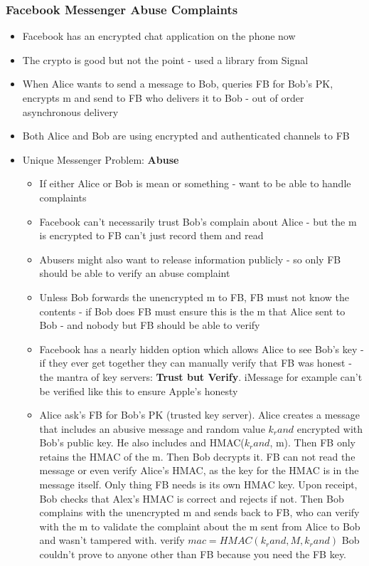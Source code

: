 \documentclass{article}
\begin{document}
\subsubsection{Facebook Messenger Abuse Complaints}
\begin{itemize}
\item Facebook has an encrypted chat application on the phone now
\item The crypto is good but not the point - used a library from Signal
\item When Alice wants to send a message to Bob, queries FB for Bob's PK, encrypts m and send to FB who delivers it to Bob - out of order asynchronous delivery
\item Both Alice and Bob are using encrypted and authenticated channels to FB
\item Unique Messenger Problem: \textbf{Abuse}
\begin{itemize}
\item If either Alice or Bob is mean or something - want to be able to handle complaints
\item Facebook can't necessarily trust Bob's complain about Alice - but the m is encrypted to FB can't just record them and read
\item Abusers might also want to release information publicly - so only FB should be able to verify an abuse complaint
\item Unless Bob forwards the unencrypted m to FB, FB must not know the contents - if Bob does FB must ensure this is the m that Alice sent to Bob - and nobody but FB should be able to verify
\item Facebook has a nearly hidden option which allows Alice to see Bob's key - if they ever get together they can manually verify that FB was honest - the mantra of key servers: \textbf{Trust but Verify}. iMessage for example can't be verified like this to ensure Apple's honesty
\item Alice ask's FB for Bob's PK (trusted key server). Alice creates a message that includes an abusive message and random value $k_rand$ encrypted with Bob's public key. He also includes and HMAC($k_rand$, m). Then FB only retains the HMAC of the m. Then Bob decrypts it. FB can not read the message or even verify Alice's HMAC, as the key for the HMAC is in the message itself. Only thing FB needs is its own HMAC key. Upon receipt, Bob checks that Alex's HMAC is correct and rejects if not. Then Bob complains with the unencrypted m and sends back to FB, who can verify with the m to validate the complaint about the m sent from Alice to Bob and wasn't tampered with. verify $mac=HMAC(k_rand, {M, k_rand})$ Bob couldn't prove to anyone other than FB because you need the FB key.
\end{itemize}
\end{itemize}
\end{document}
